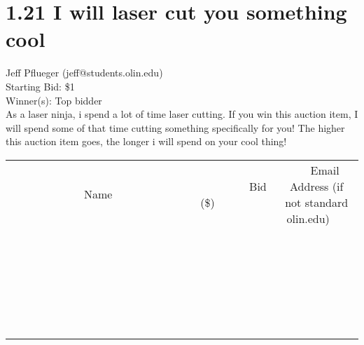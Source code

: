 \documentclass[11pt]{article}
\begin{document}
\section*{1.21 I will laser cut you something cool}
Jeff Pflueger (jeff@students.olin.edu) \\
Starting Bid: \$1 \\
Winner(s): 
Top bidder \\
As a laser ninja, i spend a lot of time laser cutting. If you win this auction item, I will spend some of that time cutting something specifically for you! The higher this auction item goes, the longer i will spend on your cool thing! \\[6ex]
\begin{tabular}{c c c}
~~~~~~~~~~~~~Name~~~~~~~~~~~~~ & ~~~~~~~~~Bid (\$)~~~~~~~~~ & ~~~Email Address (if not standard olin.edu)~~~ \\
 & & \\
\hline
 & & \\
\hline
 & & \\
\hline
 & & \\
\hline
 & & \\
\hline
 & & \\
\hline
 & & \\
\hline
 & & \\
\hline
 & & \\
\hline
 & & \\
\hline
 & & \\
\hline
 & & \\
\hline
 & & \\
\hline
 & & \\
\hline
 & & \\
\hline
 & & \\
\hline
 & & \\
\hline
 & & \\
\hline
 & & \\
\hline
 & & \\
\hline
 & & \\
\hline
 & & \\
\hline
 & & \\
\hline
 & & \\
\hline
 & & \\
\hline
 & & \\
\hline
\end{tabular}
\clearpage
\end{document}
